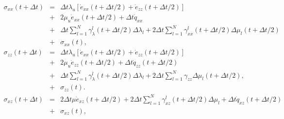 \documentclass[11pt]{article}
\begin{document}
\begin{eqnarray}
  \sigma_{xx}(t+\Delta t) & = & \Delta t\lambda_u 
                               \left [
                                 \dot{e}_{xx}(t+\Delta t/2)  + 
                                 \dot{e}_{zz}(t+\Delta t/2)
                               \right]\nonumber                              \\
                          & + & 2\mu_u \dot{e}_{xx}(t+\Delta t/2) 
                                +\Delta t\dot{q}_{xx}               \nonumber\\
                          & + & \Delta t\sum_{l=1}^N
                                 \gamma^l_{\lambda}(t+\Delta t/2)
                                 \Delta\lambda_l  
                               +2\Delta t\sum_{l=1}^N
                                 \gamma^l_{xx}(t+\Delta t/2)
                                 \Delta\mu_l(t+\Delta t/2)          \nonumber\\ 
                          & + &\sigma_{xx}(t),                               \\
  \sigma_{zz}(t+\Delta t) & = & \Delta t\lambda_u 
                            \left [\dot{e}_{xx}(t+\Delta t/2) 
                            + \dot{e}_{zz}(t+\Delta t/2)\right]           \\
                          & + & 2\mu_u \dot{e}_{zz}(t+\Delta t/2) 
                             +\Delta t \dot{q}_{zz}(t+\Delta t/2) \nonumber  \\
                          & + & \Delta t\sum_{l=1}^N
                                \gamma^l_{\lambda}(t+\Delta t/2)\Delta\lambda_l 
                            +   2\Delta t\sum_{l=1}^N
                                \gamma_{zz}
                                \Delta\mu_l (t+\Delta t/2)\nonumber,         \\
                          & + & \sigma_{zz}(t).\\
  \sigma_{xz}(t+\Delta t) & = & 2\Delta t\mu \dot{e}_{xz}(t+\Delta t/2) 
                               + 2\Delta t \sum_{l=1}^N
                               \gamma^l_{xz}(t+\Delta t/2)\Delta\mu_l+
                               \Delta t \dot{q}_{xz}(t+\Delta t/2)\nonumber\\ 
                          & +& \sigma_{xz}(t),\\
                          \label{eq:stress2d}
\end{eqnarray} 
\end{document}
